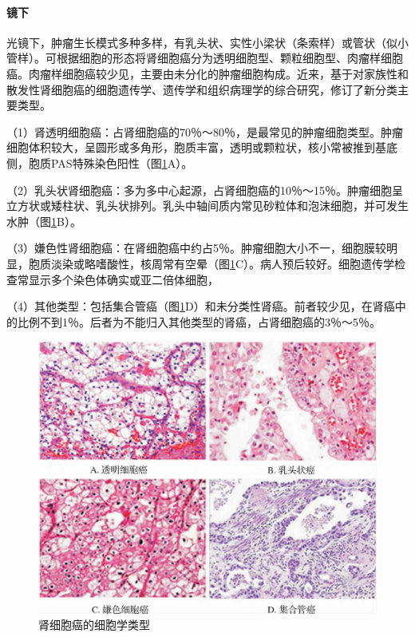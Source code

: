 \paragraph{镜下}
光镜下，肿瘤生长模式多种多样，有乳头状、实性小梁状（条索样）或管状（似小管样）。可根据细胞的形态将肾细胞癌分为透明细胞型、颗粒细胞型、肉瘤样细胞癌。肉瘤样细胞癌较少见，主要由未分化的肿瘤细胞构成。近来，基于对家族性和散发性肾细胞癌的细胞遗传学、遗传学和组织病理学的综合研究，修订了新分类主要类型。

（1）肾透明细胞癌：占肾细胞癌的70％～80％，是最常见的肿瘤细胞类型。肿瘤细胞体积较大，呈圆形或多角形，胞质丰富，透明或颗粒状，核小常被推到基底侧，胞质PAS特殊染色阳性（图\ref{fig10-30}A）。

（2）乳头状肾细胞癌：多为多中心起源，占肾细胞癌的10％～15％。肿瘤细胞呈立方状或矮柱状、乳头状排列。乳头中轴间质内常见砂粒体和泡沫细胞，并可发生水肿（图\ref{fig10-30}B）。

（3）嫌色性肾细胞癌：在肾细胞癌中约占5％。肿瘤细胞大小不一，细胞膜较明显，胞质淡染或略嗜酸性，核周常有空晕（图\ref{fig10-30}C）。病人预后较好。细胞遗传学检查常显示多个染色体确实或亚二倍体细胞，

（4）其他类型：包括集合管癌（图\ref{fig10-30}D）和未分类性肾癌。前者较少见，在肾癌中的比例不到1％。后者为不能归入其他类型的肾癌，占肾细胞癌的3％～5％。

\begin{figure}[!htbp]
 \centering
 \includegraphics{./images/Image00179.jpg}
 \captionsetup{justification=centering}
 \caption{肾细胞癌的细胞学类型}
 \label{fig10-30}
  \end{figure} 

